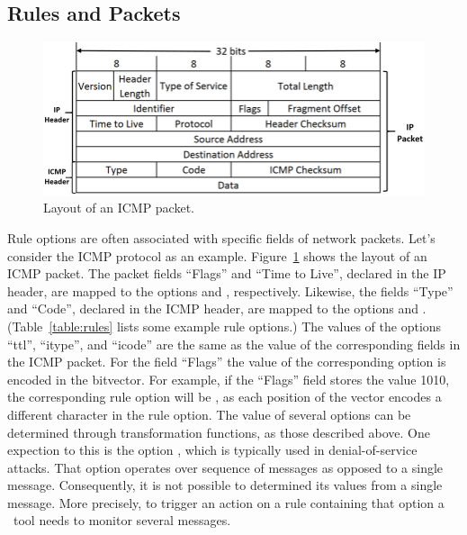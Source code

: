 \documentclass[sigconf,review, anonymous]{acmart}
\begin{document}
\subsection{Rules and Packets}
\label{sec:rules-and-packets}

\begin{figure}[h!]
\centering
\includegraphics[scale=0.28]{figs/ICMP-packet-structure.png}
\caption{Layout of an ICMP packet.}
\label{fig:icmp-packet-layout}
\end{figure}

Rule options are often associated with specific fields of network
packets. Let's consider the ICMP protocol as an
example. Figure~\ref{fig:icmp-packet-layout} shows the layout of an
ICMP packet. The packet fields ``Flags'' and ``Time to Live'',
declared in the IP header, are mapped to the options 
and , respectively. Likewise, the fields ``Type'' and
``Code'', declared in the ICMP header, are mapped to the options
 and . (Table~\ref{table:rules} lists some
example rule options.) The values of the options ``ttl'', ``itype'',
and ``icode'' are the same as the value of the corresponding fields in
the ICMP packet. For the field ``Flags'' the value of the
corresponding option is encoded in the bitvector. For example, if the
``Flags'' field stores the value 1010, the corresponding rule option
will be , as each position of the vector encodes a
different character in the  rule option. The value of
several options can be determined through transformation functions, as
those described above. One expection to this is the option
, which is typically used in denial-of-service
attacks. That option operates over sequence of messages as opposed to
a single message. Consequently, it is not possible to determined its
values from a single message. More precisely, to trigger an action on
a rule containing that option a \nids\ tool needs to monitor several
messages.
\end{document}
